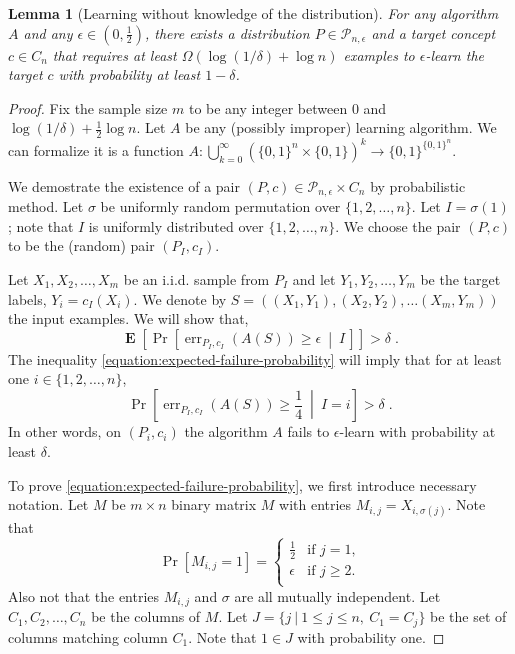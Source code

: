 \documentclass[12pt]{article}
\newtheorem{lemma}[proposition]{Lemma}
\renewcommand{\P}{\mathcal{P}}
\DeclareMathOperator{\err}{err}
\DeclareMathOperator{\Exp}{\mathbf{E}}
\begin{document}
\begin{lemma}[Learning without knowledge of the distribution]
For any algorithm $A$ and any $\epsilon \in (0,\frac{1}{2})$,
there exists a distribution $P \in \P_{n,\epsilon}$
and a target concept $c \in C_n$ that requires at least $\Omega(\log(1/\delta) + \log n)$
examples to $\epsilon$-learn the target $c$ with probability at least $1 - \delta$.
\end{lemma}

\begin{proof}
Fix the sample size $m$ to be any integer between $0$ and $\log(1/\delta) + \frac{1}{2} \log n$.
Let $A$ be any (possibly improper) learning algorithm. We can formalize
it is a function $A:\bigcup_{k=0}^\infty (\{0,1\}^n \times \{0,1\})^k \to
\{0,1\}^{\{0,1\}^n}$.

We demostrate the existence of a pair $(P,c) \in \P_{n,\epsilon} \times C_n$ by
probabilistic method. Let $\sigma$ be uniformly random permutation over
$\{1,2,\dots,n\}$. Let $I = \sigma(1)$; note that $I$ is uniformly distributed
over $\{1,2,\dots,n\}$. We choose the pair $(P,c)$ to be the (random) pair
$(P_I,c_I)$.

Let $X_1, X_2, \dots, X_m$ be an i.i.d. sample from $P_I$ and
let $Y_1, Y_2, \dots, Y_m$ be the target labels, $Y_i = c_I(X_i)$.
We denote by $S = ((X_1, Y_1), (X_2, Y_2), \dots (X_m, Y_m))$ the input examples.
We will show that,
\begin{equation}
\label{equation:expected-failure-probability}
\Exp \left[ \Pr \left[\err_{P_I,c_I}(A(S)) \ge \epsilon \ \middle| \ I \, \right] \right] > \delta \; .
\end{equation}
The inequality \eqref{equation:expected-failure-probability} will imply that for at least one $i \in \{1,2,\dots,n\}$,
$$
\Pr \left[\err_{P_I,c_I}(A(S)) \ge \frac{1}{4} \ \middle| \ I = i \right] > \delta \; .
$$
In other words, on $(P_i, c_i)$ the algorithm $A$ fails to
$\epsilon$-learn with probability at least $\delta$.

To prove \eqref{equation:expected-failure-probability}, we first introduce
necessary notation. Let $M$ be $m \times n$ binary matrix $M$ with entries
$M_{i,j} = X_{i,\sigma(j)}$. Note that
$$
\Pr[M_{i,j} = 1] =
\begin{cases}
\frac{1}{2} & \text{if $j = 1$,} \\
\epsilon & \text{if $j \ge 2$.} \\
\end{cases}
$$
Also not that the entries $M_{i,j}$ and $\sigma$ are all mutually independent. Let $C_1, C_2,
\dots, C_n$ be the columns of $M$. Let $J = \{ j ~|~ 1 \le j \le n, \ C_1 = C_j \}$
be the set of columns matching column $C_1$. Note that $1 \in J$ with probability one.


\end{proof}
\end{document}
